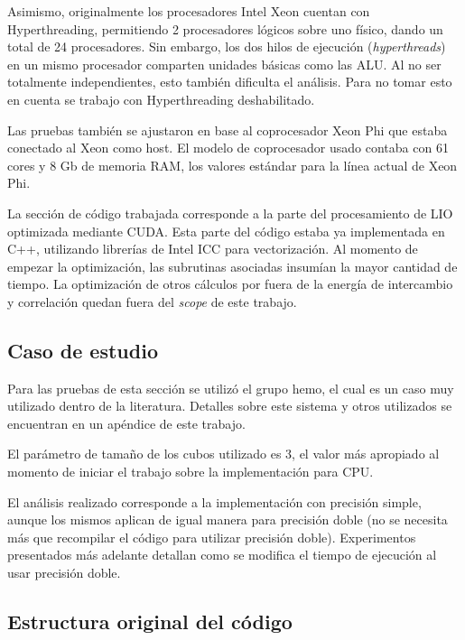 Asimismo, originalmente los procesadores Intel Xeon cuentan con Hyperthreading,
permitiendo 2 procesadores l\'ogicos sobre uno f\'isico, dando un total de 24 procesadores.
Sin embargo, los dos hilos de ejecuci\'on (\textit{hyperthreads}) en un mismo
procesador comparten unidades b\'asicas como las ALU. Al no ser totalmente
independientes, esto tambi\'en dificulta el an\'alisis. Para no tomar esto en
cuenta se trabajo con Hyperthreading deshabilitado.

Las pruebas tambi\'en se ajustaron en base al coprocesador Xeon Phi que estaba
conectado al Xeon como host. El modelo de coprocesador usado contaba con 61
cores y 8 Gb de memoria RAM, los valores est\'andar para la l\'inea actual de
Xeon Phi.

La secci\'on de c\'odigo trabajada corresponde a la parte del procesamiento
de LIO optimizada mediante CUDA. Esta parte del c\'odigo estaba ya implementada
en C++, utilizando librer\'ias de Intel ICC para vectorizaci\'on. Al momento
de empezar la optimizaci\'on, las subrutinas asociadas insum\'ian la mayor
cantidad de tiempo. La optimizaci\'on de otros c\'alculos por fuera de la
energ\'ia de intercambio y correlaci\'on quedan fuera del \textit{scope} de este
trabajo.

\subsection{Caso de estudio}

Para las pruebas de esta secci\'on se utiliz\'o el grupo hemo, el
cual es un caso muy utilizado dentro de la literatura. Detalles sobre este
sistema y otros utilizados se encuentran en un ap\'endice de este trabajo.

El par\'ametro de tama\~no de los cubos utilizado es 3, el valor m\'as
apropiado al momento de iniciar el trabajo sobre la implementaci\'on para CPU.

El an\'alisis realizado corresponde a la implementaci\'on con precisi\'on simple,
aunque los mismos aplican de igual manera para precisi\'on doble (no se necesita
m\'as que recompilar el c\'odigo para utilizar precisi\'on doble). Experimentos
presentados m\'as adelante detallan como se modifica el tiempo de ejecuci\'on al
usar precisi\'on doble.


\subsection{Estructura original del c\'odigo}

